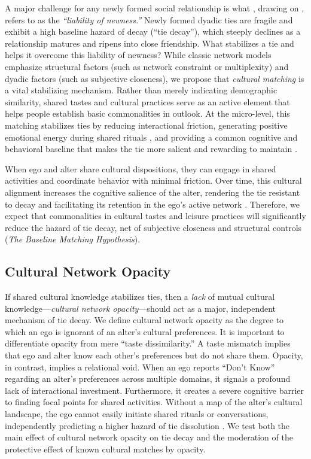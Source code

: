 \documentclass[
  letterpaper,
  DIV=11,
  numbers=noendperiod]{scrartcl}
\begin{document}
A major challenge for any newly formed social relationship is what \citet{burt2000}, drawing on \citet{stinchcombe1965}, refers to as the \textit{``liability of newness.''} Newly formed dyadic ties are fragile and exhibit a high baseline hazard of decay (``tie decay''), which steeply declines as a relationship matures and ripens into close friendship. What stabilizes a tie and helps it overcome this liability of newness? While classic network models emphasize structural factors (such as network constraint or multiplexity) and dyadic factors (such as subjective closeness), we propose that \textit{cultural matching} is a vital stabilizing mechanism. Rather than merely indicating demographic similarity, shared tastes and cultural practices serve as an active element that helps people establish basic commonalities in outlook. At the micro-level, this matching stabilizes ties by reducing interactional friction, generating positive emotional energy during shared rituals \citep{collins2004}, and providing a common cognitive and behavioral baseline that makes the tie more salient and rewarding to maintain \citep{dimaggio1987}.

When ego and alter share cultural dispositions, they can engage in shared activities and coordinate behavior with minimal friction. Over time, this cultural alignment increases the cognitive salience of the alter, rendering the tie resistant to decay and facilitating its retention in the ego's active network \citep{burt2000}. Therefore, we expect that commonalities in cultural tastes and leisure practices will significantly reduce the hazard of tie decay, net of subjective closeness and structural controls (\textit{The Baseline Matching Hypothesis}).

\subsection{Cultural Network Opacity}\label{cultural-network-opacity}

If shared cultural knowledge stabilizes ties, then a \textit{lack} of mutual cultural knowledge---\textit{cultural network opacity}---should act as a major, independent mechanism of tie decay. We define cultural network opacity as the degree to which an ego is ignorant of an alter's cultural preferences. It is important to differentiate opacity from mere ``taste dissimilarity.'' A taste mismatch implies that ego and alter know each other's preferences but do not share them. Opacity, in contrast, implies a relational void. When an ego reports ``Don't Know'' regarding an alter's preferences across multiple domains, it signals a profound lack of interactional investment. Furthermore, it creates a severe cognitive barrier to finding focal points for shared activities. Without a map of the alter's cultural landscape, the ego cannot easily initiate shared rituals or conversations, independently predicting a higher hazard of tie dissolution \citep{burt2002, wellman1997}. We test both the main effect of cultural network opacity on tie decay and the moderation of the protective effect of known cultural matches by opacity.
\end{document}
